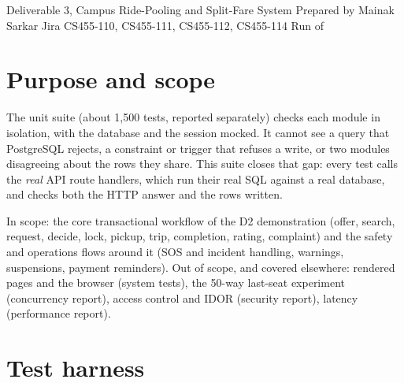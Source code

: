 \documentclass[10pt]{article}
\begin{document}
  {Deliverable 3, Campus Ride-Pooling and Split-Fare System}
  {Prepared by Mainak Sarkar \quad Jira CS455-110, CS455-111, CS455-112, CS455-114 \quad Run of \RunDate}


\section{Purpose and scope}
The unit suite (about 1,500 tests, reported separately) checks each module in isolation, with the
database and the session mocked. It cannot see a query that PostgreSQL rejects, a constraint or
trigger that refuses a write, or two modules disagreeing about the rows they share. This suite
closes that gap: every test calls the \emph{real} API route handlers, which run their real SQL
against a real database, and checks both the HTTP answer and the rows written.

In scope: the core transactional workflow of the D2 demonstration (offer, search, request,
decide, lock, pickup, trip, completion, rating, complaint) and the safety and operations flows
around it (SOS and incident handling, warnings, suspensions, payment reminders). Out of scope,
and covered elsewhere: rendered pages and the browser (system tests), the 50-way last-seat
experiment (concurrency report), access control and IDOR (security report), latency
(performance report).

\section{Test harness}
\end{document}
